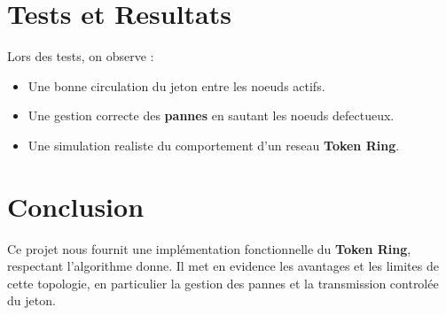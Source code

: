 \documentclass{rapportINPTCLOUD}
\begin{document}
\section{Tests et Resultats}
Lors des tests, on observe :
\begin{itemize}
    \item Une bonne circulation du jeton entre les noeuds actifs.
    \item Une gestion correcte des \textbf{pannes} en sautant les noeuds defectueux.
    \item Une simulation realiste du comportement d’un reseau \textbf{Token Ring}.
\end{itemize}



\section{Conclusion}
Ce projet nous fournit une implémentation fonctionnelle du \textbf{Token Ring}, respectant l’algorithme donne. Il met en evidence les avantages et les limites de cette topologie, en particulier la gestion des pannes et la transmission controlée du jeton.
\end{document}
